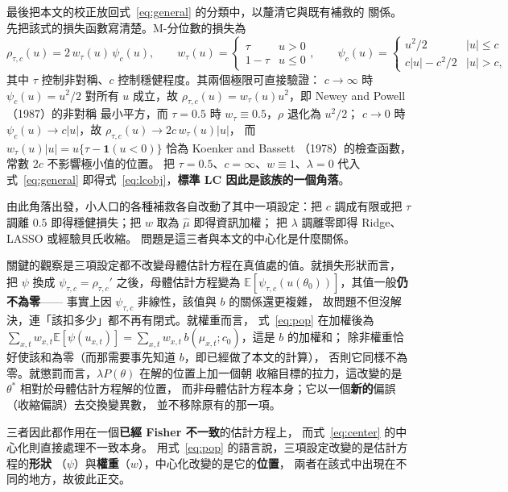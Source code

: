 \documentclass[UTF8, fontset=macnew, a4paper, 12pt]{ctexart}
\newcommand{\Ex}{\mathbb{E}}
\begin{document}
最後把本文的校正放回式~\eqref{eq:general} 的分類中，以釐清它與既有補救的
關係。先把該式的損失函數寫清楚。M-分位數的損失為
\begin{equation}\label{eq:mq}
\rho_{\tau,c}(u)=2\,w_\tau(u)\,\psi_c(u),\qquad
w_\tau(u)=\begin{cases}\tau & u>0\\ 1-\tau & u\le 0\end{cases},\qquad
\psi_c(u)=\begin{cases}u^2/2 & |u|\le c\\ c|u|-c^2/2 & |u|>c,\end{cases}
\end{equation}
其中 $\tau$ 控制非對稱、$c$ 控制穩健程度。其兩個極限可直接驗證：
$c\to\infty$ 時 $\psi_c(u)=u^2/2$ 對所有 $u$ 成立，故
$\rho_{\tau,c}(u)=w_\tau(u)u^2$，即 Newey and Powell（1987）的非對稱
最小平方，而 $\tau=0.5$ 時 $w_\tau\equiv0.5$，$\rho$ 退化為 $u^2/2$；
$c\to0$ 時 $\psi_c(u)\to c|u|$，故 $\rho_{\tau,c}(u)\to 2c\,w_\tau(u)|u|$，
而 $w_\tau(u)|u|=u\{\tau-\mathbf{1}(u<0)\}$ 恰為 Koenker and Bassett
（1978）的檢查函數，常數 $2c$ 不影響極小值的位置。
把 $\tau=0.5$、$c=\infty$、$w\equiv1$、$\lambda=0$ 代入式~\eqref{eq:general}
即得式~\eqref{eq:lcobj}，\textbf{標準 LC 因此是該族的一個角落}。

由此角落出發，小人口的各種補救各自改動了其中一項設定：把 $c$ 調成有限或把
$\tau$ 調離 $0.5$ 即得穩健損失；把 $w$ 取為 $\hat\mu$ 即得資訊加權；
把 $\lambda$ 調離零即得 Ridge、LASSO 或經驗貝氏收縮。
問題是這三者與本文的中心化是什麼關係。

關鍵的觀察是三項設定都不改變母體估計方程在真值處的值。就損失形狀而言，
把 $\psi$ 換成 $\psi_{\tau,c}=\rho_{\tau,c}'$ 之後，母體估計方程變為
$\Ex[\psi_{\tau,c}(u(\theta_0))]$，其值一般\textbf{仍不為零}——
事實上因 $\psi_{\tau,c}$ 非線性，該值與 $b$ 的關係還更複雜，
故問題不但沒解決，連「該扣多少」都不再有閉式。就權重而言，
式~\eqref{eq:pop} 在加權後為 $\sum_{x,t}w_{x,t}\Ex[\psi(u_{x,t})]=
\sum_{x,t}w_{x,t}\,b(\mu_{x,t};c_0)$，這是 $b$ 的加權和；
除非權重恰好使該和為零（而那需要事先知道 $b$，即已經做了本文的計算），
否則它同樣不為零。就懲罰而言，$\lambda P(\theta)$ 在解的位置上加一個朝
收縮目標的拉力，這改變的是 $\theta^{\ast}$ 相對於母體估計方程解的位置，
而非母體估計方程本身；它以一個\textbf{新的}偏誤（收縮偏誤）去交換變異數，
並不移除原有的那一項。

三者因此都作用在一個\textbf{已經 Fisher 不一致}的估計方程上，
而式~\eqref{eq:center} 的中心化則直接處理不一致本身。
用式~\eqref{eq:pop} 的語言說，三項設定改變的是估計方程的\textbf{形狀}
（$\psi$）與\textbf{權重}（$w$），中心化改變的是它的\textbf{位置}，
兩者在該式中出現在不同的地方，故彼此正交。
\end{document}
